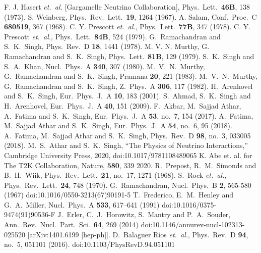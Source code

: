 \begin{thebibliography}{99}
\itemsep=0pt
 F. J. Hasert {\it et.\ al.} [Gargamelle Neutrino Collaboration], Phys.\ Lett.\  {\bf 46B}, 138 (1973).  
 S. Weinberg, Phys.\ Rev.\ Lett.\  {\bf 19}, 1264 (1967).
 A. Salam,  Conf.\ Proc.\ C {\bf 680519}, 367 (1968).
 C. Y. Prescott {\it et.\ al.}, Phys.\ Lett.\  {\bf 77B}, 347 (1978).
 C. Y. Prescott {\it et.\ al.}, Phys.\ Lett.\  {\bf 84B}, 524 (1979).
 G.~Ramachandran and S.~K.~Singh, Phys.\ Rev.\ D {\bf 18}, 1441 (1978).
 M. V. N. Murthy, G. Ramachandran and S.~K.~Singh, Phys.\ Lett.\  {\bf 81B}, 129 (1979).
 S.~K.~Singh and S.~A.~Khan, Nucl.\ Phys.\ A {\bf 340}, 307 (1980).
 M.~V.~N.~Murthy, G.~Ramachandran and S.~K.~Singh, Pramana {\bf 20}, 221 (1983).
 M.~V.~N.~Murthy, G.~Ramachandran and S.~K.~Singh, Z.\ Phys.\ A {\bf 306}, 117 (1982).
 H.~Arenhovel and S.~K.~Singh, Eur.\ Phys.\ J.\ A {\bf 10}, 183 (2001).
 S.~Ahmad, S.~K.~Singh and H.~Arenhovel, Eur.\ Phys.\ J.\ A {\bf 40}, 151 (2009).
 F.~Akbar, M.~Sajjad Athar, A.~Fatima and S.~K.~Singh, Eur.\ Phys.\ J.\ A {\bf 53}, no.\ 7, 154 (2017).
 A.~Fatima, M.~Sajjad Athar and S.~K.~Singh, Eur.\ Phys.\ J.\ A {\bf 54}, no.\ 6, 95 (2018).
 A.~Fatima, M.~Sajjad Athar and S.~K.~Singh, Phys.\ Rev.\ D {\bf 98}, no.\ 3, 033005 (2018).
 M.~S.~Athar and S.~K.~Singh, ``The Physics of Neutrino Interactions,'' Cambridge University Press, 2020,  doi:10.1017/9781108489065
 K. Abe et. al. for The T2K Collaboration, Nature, {\bf 580}, 339 2020.
 R.~Prepost, R.~M.~Simonds and B.~H.~Wiik, Phys.\ Rev.\ Lett.\  {\bf 21}, no.\ 17, 1271 (1968).
 S.~Rock {\it et.\ al.}, Phys.\ Rev.\ Lett.\  {\bf 24}, 748 (1970).
 G.~Ramachandran, Nucl.\ Phys.\ B \textbf{2}, 565-580 (1967) doi:10.1016/0550-3213(67)90191-5
 T.~Frederico, E.~M.~Henley and G.~A.~Miller, Nucl.\ Phys.\ A \textbf{533}, 617--641 (1991) doi:10.1016/0375-9474(91)90536-F
  J.~Erler, C.~J.~Horowitz, S.~Mantry and P.~A.~Souder, Ann.\ Rev.\ Nucl.\ Part.\ Sci.\  {\bf 64}, 269 (2014)   doi:10.1146/annurev-nucl-102313-025520  [arXiv:1401.6199 [hep-ph]].
 D.~Balaguer Ríos {\it et.\ al.}, Phys.\ Rev.\ D {\bf 94}, no.\ 5, 051101 (2016).   doi:10.1103/PhysRevD.94.051101

\end{thebibliography}
